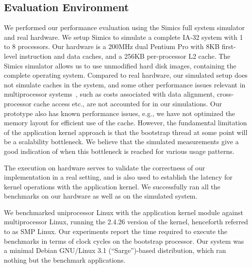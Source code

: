 \subsection{Evaluation Environment}

We performed our performance evaluation using the Simics full system
simulator~\cite{simics} and real hardware. We setup Simics to simulate a
complete IA-32 system with 1 to 8 processors. Our hardware is a 200MHz dual
Pentium Pro with 8KB first-level instruction and data caches, and a 256KB
per-processor L2 cache. The Simics simulator allows us to use unmodified hard
disk images, containing the complete operating system.  Compared to real
hardware, our simulated setup does not simulate caches in the system, and some
other performance issues relevant in multiprocessor
systems~\cite{gamsa95performance}, such as costs associated with data
alignment, cross-processor cache access etc., are not accounted for in our
simulations. Our prototype also has known performance issues, e.g., we have
not optimized the memory layout for efficient use of the cache. However, the
fundamental limitation of the application kernel approach is that the
bootstrap thread at some point will be a scalability bottleneck. We believe
that the simulated measurements give a good indication of when this bottleneck
is reached for various usage patterns.

\label{fix:hardware}The execution on hardware serves to validate the correctness of our
implementation in a real setting, and is also used to establish the latency
for kernel operations with the application kernel. We successfully ran all the
benchmarks on our hardware as well as on the simulated system.

We benchmarked uniprocessor Linux with the application kernel module against
multiprocessor Linux, running the 2.4.26 version of the kernel, henceforth
referred to as SMP Linux. Our experiments report the time required to execute the
benchmarks in terms of clock cycles on the bootstrap processor. Our system was
a minimal Debian GNU/Linux 3.1 (``Sarge'')-based distribution, which ran
nothing but the benchmark applications.

